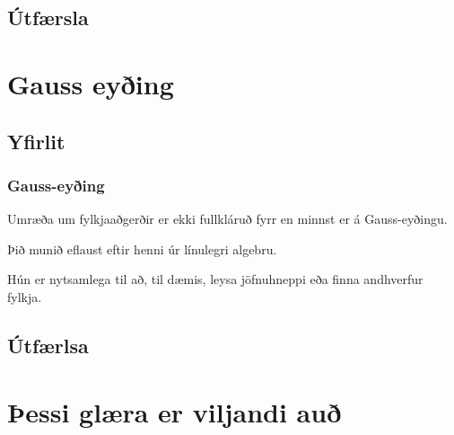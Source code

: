 \subsection{Útfærsla}
{
}

\section{Gauss eyðing}
\subsection{Yfirlit}
{
    \frametitle{Gauss-eyðing}
    {
        \item<1-> Umræða um fylkjaaðgerðir er ekki fullkláruð fyrr en minnst er á Gauss-eyðingu.
        \item<2-> Þið munið eflaust eftir henni úr línulegri algebru.
        \item<3-> Hún er nytsamlega til að, til dæmis, leysa jöfnuhneppi eða finna andhverfur fylkja.
    }
}

\subsection{Útfærlsa}
{
}

\section{Þessi glæra er viljandi auð}
{
}



